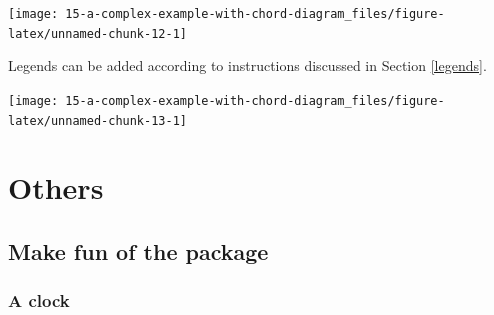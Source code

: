 \documentclass[]{book}
\newenvironment{Shaded}{\begin{snugshade}}{\end{snugshade}}
\newcommand{\KeywordTok}[1]{\textcolor[rgb]{0.13,0.29,0.53}{\textbf{#1}}}
\newcommand{\DataTypeTok}[1]{\textcolor[rgb]{0.13,0.29,0.53}{#1}}
\newcommand{\DecValTok}[1]{\textcolor[rgb]{0.00,0.00,0.81}{#1}}
\newcommand{\FloatTok}[1]{\textcolor[rgb]{0.00,0.00,0.81}{#1}}
\newcommand{\StringTok}[1]{\textcolor[rgb]{0.31,0.60,0.02}{#1}}
\newcommand{\OperatorTok}[1]{\textcolor[rgb]{0.81,0.36,0.00}{\textbf{#1}}}
\newcommand{\NormalTok}[1]{#1}
\begin{document}
\begin{Shaded}
\end{Shaded}

\begin{center}\texttt{[image: 15-a-complex-example-with-chord-diagram\_files/figure-latex/unnamed-chunk-12-1]} \end{center}

Legends can be added according to instructions discussed in Section
\ref{legends}.

\begin{center}\texttt{[image: 15-a-complex-example-with-chord-diagram\_files/figure-latex/unnamed-chunk-13-1]} \end{center}

\part{Others}\label{part-others}

\chapter{Make fun of the package}\label{make-fun-of-the-package}

\section{A clock}\label{a-clock}
\end{document}
